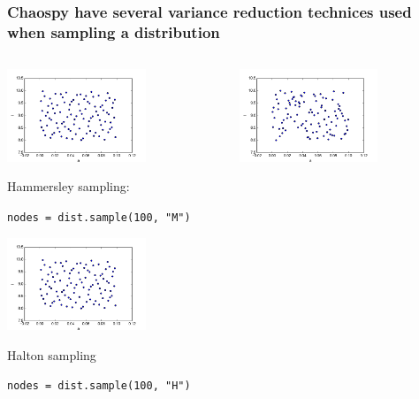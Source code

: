 \documentclass[handout]{beamer}
\begin{document}
\begin{frame}[fragile]
 \frametitle{Chaospy have several variance reduction technices used when sampling a distribution}
 \vspace{-2mm}
 \begin{columns}
     \begin{center}
                \includegraphics[width=0.65\textwidth]{samples_H.png}

                Hammersley sampling:

                \scriptsize
                \verb;nodes = dist.sample(100, "M");
                \normalsize

                \includegraphics[width=0.65\textwidth]{samples_H.png}

                Halton sampling

                \scriptsize
                \verb;nodes = dist.sample(100, "H");
                \normalsize

     \end{center}
     \begin{center}
                  \includegraphics[width=0.65\textwidth]{samples_L.png}


\end{center}
\end{columns}
\end{frame}
\end{document}
